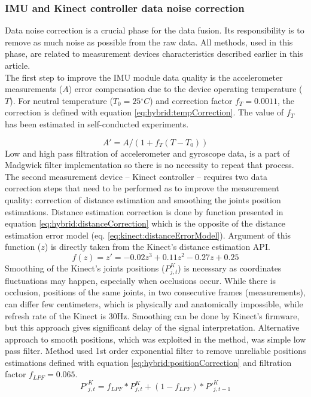 \documentclass[sensors,article,submit,moreauthors,pdftex,10pt,a4paper]{mdpi}
\newcommand{\degree}{\ensuremath{{}^{\circ}}\xspace}
\begin{document}
\subsubsection{IMU and Kinect controller data noise correction}
Data noise correction is a crucial phase for the data fusion. Its responsibility is to remove as much noise as possible from the raw data. All methods, used in this phase, are related to measurement devices characteristics described earlier in this article.\\
The first step to improve the IMU module data quality is the accelerometer measurements ($A$) error compensation due to the device operating temperature ($T$). For neutral temperature ($T_0=25\degree C$) and correction factor $f_T= 0.0011$, the correction is defined with equation \ref{eq:hybrid:tempCorrection}. The value of $f_T$ has been estimated in self-conducted experiments.

\begin{equation}
	A'=A/(1+ f_T (T-T_0))
	\label{eq:hybrid:tempCorrection}
\end{equation}
Low and high pass filtration of accelerometer and gyroscope data, is a part of Madgwick filter implementation so there is no necessity to repeat that process.
The second measurement device – Kinect controller – requires two data correction steps that need to be performed as to improve the measurement quality: correction of distance estimation and smoothing the joints position estimations. Distance estimation correction is done by function presented in equation \ref{eq:hybrid:distanceCorrection} which is the opposite of the distance estimation error model (eq. \ref{eq:kinect:distanceErrorModel}). Argument of this function ($z$) is directly taken from the Kinect’s distance estimation API.
\begin{equation}
	f(z)=z'=-0.02z^3+0.11z^2-0.27z+0.25
	\label{eq:hybrid:distanceCorrection}
\end{equation}
Smoothing of the Kinect’s joints positions ($P_{j,t}^K$) is necessary as coordinates fluctuations may happen, especially when occlusions occur. While there is occlusion, positions of the same joints, in two consecutive frames (measurements), can differ few centimeters, which is physically and anatomically impossible, while refresh rate of the Kinect is 30Hz. Smoothing can be done by Kinect’s firmware, but this approach gives significant delay of the signal interpretation. Alternative approach to smooth positions, which was exploited in the method, was simple low pass filter. Method used 1st order exponential filter to remove unreliable positions estimations defined with equation \ref{eq:hybrid:positionCorrection} and filtration factor $f_{LPF} = 0.065$.
\begin{equation}
	{P'}_{j,t}^K=f_{LPF} * P_{j,t}^K+(1-f_{LPF}) * {P'}_{j,t-1}^K
	\label{eq:hybrid:positionCorrection}
\end{equation}
\end{document}
